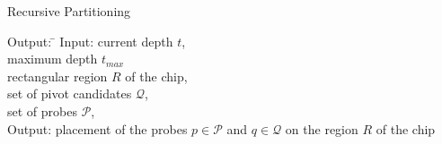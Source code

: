 \documentclass{llncs}
\begin{document}
\begin{algorithm}
\caption{Recursive Partitioning}
\label{alg:recursivepart}
\begin{minipage}{4.8in}

\begin{tabbing}
Output: \=                                  \kill
Input:  \> current depth $t$,                     \\
        \> maximum depth $t_{max}$                    \\
        \> rectangular region $R$ of the chip,                  \\
        \> set of pivot candidates $\mathcal{Q}$,               \\
        \> set of probes $\mathcal{P}$,                     \\
Output: \> placement of the probes $p \in \mathcal{P}$ and
           $q \in \mathcal{Q}$ on the region $R$ of the chip
\end{tabbing}


\end{minipage}
\end{algorithm}
\end{document}
